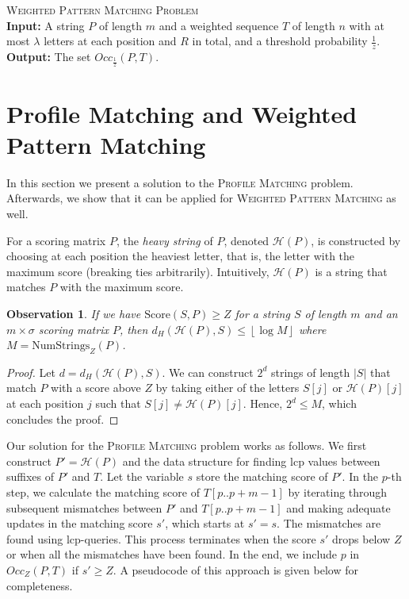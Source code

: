 \documentclass{article}
\theoremstyle{plain}
\newtheorem{observation}[theorem]{Observation}
\theoremstyle{definition}
\newenvironment{dsproblem}[1]
{\begin{center}\begin{lrbox}{\mybox}\begin{minipage}{0.96\columnwidth}#1 \textsc{Problem}\\}
{\end{minipage}\end{lrbox}\fbox{\usebox{\mybox}}\end{center}}
\newcommand{\defdsproblem}[3]{
  \begin{dsproblem}{#1}
\textbf{Input:} #2\\
\textbf{Output:} #3
  \end{dsproblem}
  }
\newcommand{\PM}{\textsc{Profile Matching}\xspace}
\newcommand{\WPM}{\textsc{Weighted Pattern Matching}\xspace}
\newcommand{\floor}[1]{\left\lfloor #1 \right\rfloor}
\newcommand{\Occ}{\mathit{Occ}}
\renewcommand{\H}{\mathcal{H}}
\newcommand{\fr}{\ensuremath{\frac1z}}
\newcommand{\mayqed}{}
\newcommand{\HammingDistance}{d_H}
\newcommand{\Score}{\mathrm{Score}}
\newcommand{\NumStrings}{\mathrm{NumStrings}}
\begin{document}
    \defdsproblem{\WPM}{
      A string $P$ of length $m$ and a weighted sequence $T$ of length $n$ with at most $\lambda$ letters at each position
      and $R$ in total, and a threshold probability \fr.
    }{
      The set $\Occ_\fr(P,T)$.
    }




  \section{Profile Matching and Weighted Pattern Matching}\label{sec:EWPM}
    In this section we present a solution to the \PM problem.
    Afterwards, we show that it can be applied for \WPM as well.

    For a scoring matrix $P$, the \emph{heavy string} of $P$, denoted $\H(P)$,
    is constructed by choosing at each position the heaviest letter, that is,
    the letter with the maximum score (breaking ties arbitrarily).
    Intuitively, $\H(P)$ is a string that matches $P$ with the maximum score.

    \begin{observation}\label{obs:crucial_profile}
      If we have $\Score(S,P) \ge Z$ for a string $S$ of length $m$ and an $m \times \sigma$ scoring matrix $P$,
      then $\HammingDistance(\H(P),S) \le \floor{\log M}$ where $M = \NumStrings_Z(P)$.
    \end{observation}
    \begin{proof}
      Let $d = \HammingDistance(\H(P),S)$.
      We can construct $2^{d}$ strings of length $|S|$ that match $P$ with a score above $Z$
      by taking either of the letters $S[j]$ or $\H(P)[j]$ at each position $j$ such that $S[j]\ne \H(P)[j]$.
      Hence, $2^{d} \le M$, which concludes the proof.
    \mayqed\end{proof}

    Our solution for the \PM problem works as follows.
    We first construct $P' = \H(P)$ and the data structure for finding lcp values between suffixes of $P'$ and $T$.
    Let the variable $s$ store the matching score of $P'$.
    In the $p$-th step, we calculate the matching score of $T[p..p+m-1]$ by iterating through
    subsequent mismatches between $P'$ and $T[p..p+m-1]$ and making adequate updates in the matching score $s'$, which
    starts at $s'=s$.
    The mismatches are found using lcp-queries.
    This process terminates when the score $s'$ drops below $Z$ or when all the mismatches have been found.
    In the end, we include $p$ in $\Occ_Z(P,T)$ if $s' \ge Z$.
    A pseudocode of this approach is given below for completeness.
\end{document}
